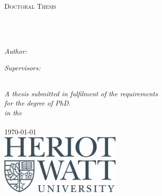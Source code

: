 \begin{titlepage}

    \begin{center}
    
        \textsc{\LARGE \univname}\\[1.5cm] %
        \textsc{\Large Doctoral Thesis}\\[0.5cm] %
        
        \HRule \\[0.4cm] %
        {\huge \bfseries \ttitle}\\[0.4cm] %
        \HRule \\[1.5cm] %
        
        \begin{minipage}{0.4\textwidth}
        \begin{flushleft} \large
        \emph{Author:}\\
        \authornames %
        \end{flushleft}
        \end{minipage}
        \begin{minipage}{0.4\textwidth}
            \vspace{0.6cm}
        \begin{flushright} \large
        \emph{Supervisors:} \\
        \supname %
        \end{flushright}
        \end{minipage}\\[3cm]
        
        \large \textit{A thesis submitted in fulfilment of the requirements\\ for the degree of PhD. }\\[0.3cm] %
        \textit{in the}\\[0.4cm]
        
        \deptname\\[2cm] %
        
        {\large \today}\\[1cm] %
        \includegraphics[width=6cm]{./Figures/HWUlogo.jpg} %
        
        \vfill

    \end{center}
    
\end{titlepage}